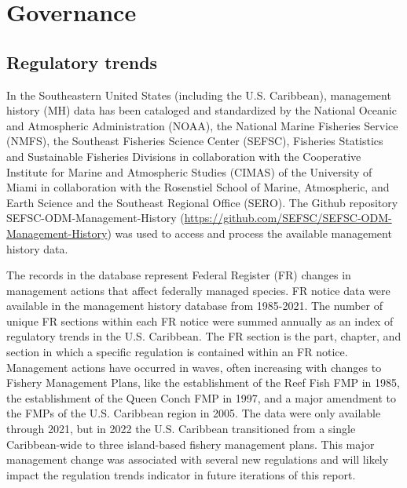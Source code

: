 \documentclass[
  letterpaper,
  oneside,
  open=any]{scrbook}
\begin{document}
\section{Governance}\label{governance}

\subsection{Regulatory trends}\label{regulatory-trends}

In the Southeastern United States (including the U.S. Caribbean),
management history (MH) data has been cataloged and standardized by the
National Oceanic and Atmospheric Administration (NOAA), the National
Marine Fisheries Service (NMFS), the Southeast Fisheries Science Center
(SEFSC), Fisheries Statistics and Sustainable Fisheries Divisions in
collaboration with the Cooperative Institute for Marine and Atmospheric
Studies (CIMAS) of the University of Miami in collaboration with the
Rosenstiel School of Marine, Atmospheric, and Earth Science and the
Southeast Regional Office (SERO). The Github repository
SEFSC-ODM-Management-History
(\url{https://github.com/SEFSC/SEFSC-ODM-Management-History}) was used
to access and process the available management history data.

The records in the database represent Federal Register (FR) changes in
management actions that affect federally managed species. FR notice data
were available in the management history database from 1985-2021. The
number of unique FR sections within each FR notice were summed annually
as an index of regulatory trends in the U.S. Caribbean. The FR section
is the part, chapter, and section in which a specific regulation is
contained within an FR notice. Management actions have occurred in
waves, often increasing with changes to Fishery Management Plans, like
the establishment of the Reef Fish FMP in 1985, the establishment of the
Queen Conch FMP in 1997, and a major amendment to the FMPs of the U.S.
Caribbean region in 2005. The data were only available through 2021, but
in 2022 the U.S. Caribbean transitioned from a single Caribbean-wide to
three island-based fishery management plans. This major management
change was associated with several new regulations and will likely
impact the regulation trends indicator in future iterations of this
report.
\end{document}
